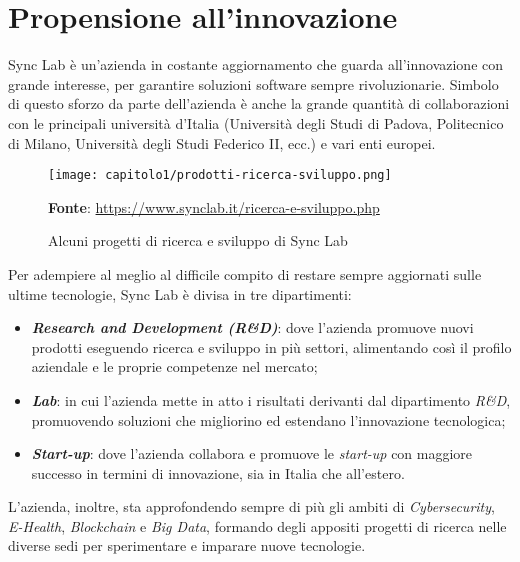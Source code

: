 
\section{Propensione all'innovazione}
Sync Lab è un'azienda in costante aggiornamento che guarda all'innovazione con grande interesse, per garantire soluzioni software sempre rivoluzionarie. Simbolo di questo sforzo da parte dell'azienda è anche la grande quantità di collaborazioni con le principali università d'Italia (Università degli Studi di Padova, Politecnico di Milano, Università degli Studi Federico II, ecc.) e vari enti europei. \\

\begin{figure}[!h]
  \centering
  \texttt{[image: capitolo1/prodotti-ricerca-sviluppo.png]}
  \caption{Alcuni progetti di ricerca e sviluppo di Sync Lab}
  \textbf{Fonte}: \href{https://www.synclab.it/ricerca-e-sviluppo.php}{https://www.synclab.it/ricerca-e-sviluppo.php}
\end{figure}

Per adempiere al meglio al difficile compito di restare sempre aggiornati sulle ultime tecnologie, Sync Lab è divisa in tre dipartimenti:
\begin{itemize}
  \item \textbf{\textit{Research and Development (R\&D)}}: dove l'azienda promuove nuovi prodotti eseguendo ricerca e sviluppo in più settori, alimentando così il profilo aziendale e le proprie competenze nel mercato;
  \item \textbf{\textit{Lab}}: in cui l'azienda mette in atto i risultati derivanti dal dipartimento \textit{R\&D}, promuovendo soluzioni che migliorino ed estendano l'innovazione tecnologica;
  \item \textbf{\textit{Start-up}}: dove l'azienda collabora e promuove le \textit{start-up} con maggiore successo in termini di innovazione, sia in Italia che all'estero.
\end{itemize}  

L'azienda, inoltre, sta approfondendo sempre di più gli ambiti di \textit{Cybersecurity}, \textit{E-Health}, \textit{Blockchain} e \textit{Big Data}, formando degli appositi progetti di ricerca nelle diverse sedi per sperimentare e imparare nuove tecnologie. \\

